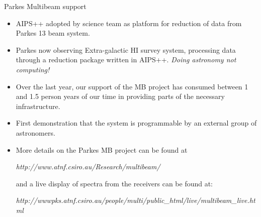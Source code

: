 \begin{slide}{Parkes Multibeam support}
\begin{itemize}
\item AIPS++ adopted by science team as platform for reduction
of data from Parkes 13 beam system.
\item Parkes now observing Extra-galactic HI survey 
system, processing data through a reduction package written in 
AIPS++. {\em Doing astronomy not computing!}
\item Over the last year, our support of
the MB project has consumed between 1 and 1.5 person years of our time
in providing parts of the necessary infrastructure.  
\item First demonstration that the system is programmable by an external 
group of astronomers.
\item More details on the Parkes MB project can be found at

{\em http://www.atnf.csiro.au/Research/multibeam/}

and a live display of spectra from the receivers can be found at:

{\em http://wwwpks.atnf.csiro.au/people/multi/public\_html/live/multibeam\_live.html}

\end{itemize}
\end{slide}

